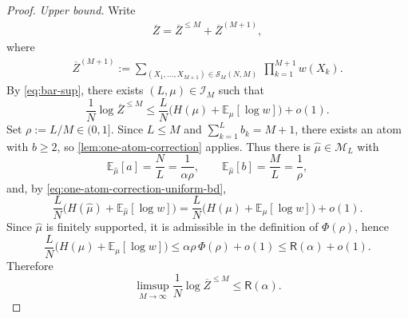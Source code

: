 \documentclass[11pt]{amsart}
\numberwithin{equation}{section}
\numberwithin{equation}{section}
\newcommand{\1}{\mathbbm{1}}
\newcommand{\E}{\mathbb{E}}
\theoremstyle{definition}
\begin{document}
\begin{proof}
\medskip\noindent\emph{Upper bound.}
Write
\begin{align*}
    \overline{Z}=\overline{Z}^{\le M}+\overline{Z}^{(M+1)},
\end{align*}
where
\begin{align*}
    \overline{Z}^{(M+1)}:=\sum_{(X_1,\dots,X_{M+1})\in \mathcal{S}_{M}(N,M)}\ \prod_{k=1}^{M+1} w(X_k).
\end{align*}
By \eqref{eq:bar-sup}, there exists $(L,\mu)\in\mathcal I_M$ such that
\[
\frac{1}{N}\log \overline{Z}^{\le M}
\le \frac{L}{N}\Big(H(\mu)+\E_\mu[\log w]\Big)+o(1).
\]
Set $\rho:=L/M\in(0,1]$. Since $L\le M$ and $\sum_{k=1}^{L} b_k=M+1$, there exists an atom with $b\ge 2$, so \cref{lem:one-atom-correction} applies. Thus there is $\widehat\mu\in\mathcal M_L$ with
\[
\E_{\widehat\mu}[a]=\frac{N}{L}=\frac{1}{\alpha\rho},\qquad \E_{\widehat\mu}[b]=\frac{M}{L}=\frac{1}{\rho},
\]
and, by \eqref{eq:one-atom-correction-uniform-bd},
\[
\frac{L}{N}\Big(H(\widehat\mu)+\E_{\widehat\mu}[\log w]\Big)
=\frac{L}{N}\Big(H(\mu)+\E_\mu[\log w]\Big)+o(1).
\]
Since $\widehat\mu$ is finitely supported, it is admissible in the definition of $\Phi(\rho)$, hence
\[
\frac{L}{N}\Big(H(\mu)+\E_\mu[\log w]\Big)
\le \alpha\rho\,\Phi(\rho)+o(1)
\le \mathsf R(\alpha)+o(1).
\]
Therefore
\begin{equation}\label{eq:limsup-full-leM}
    \limsup_{M\to\infty}\frac{1}{N}\log \overline{Z}^{\le M}\le \mathsf R(\alpha).
\end{equation}


\end{proof}
\end{document}
